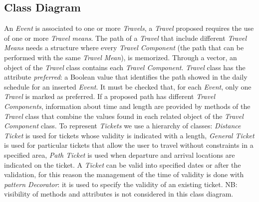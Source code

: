 \subsection{Class Diagram}
\noindent{}
\newline
An \textit{Event} is associated to one or more \textit{Travels}, a \textit{Travel} proposed requires the use of one or more \textit{Travel means}. The path of a \textit{Travel} that include different \textit{Travel Means} needs a structure where every \textit{Travel Component} (the path that can be performed with the same \textit{Travel Mean}), is memorized. Through a vector, an object of the \textit{Travel} class contains each \textit{Travel Component}.
\newline
\newline
\textit{Travel} class has the attribute \textit{preferred}: a Boolean value that identifies the path showed in the daily schedule for an inserted \textit{Event}. It must be checked that, for each \textit{Event}, only one \textit{Travel} is marked as preferred.
\newline
If a proposed path has different \textit{Travel Components}, information about time and length are provided by methods of the \textit{Travel} class that combine the values found in each related object of the \textit{Travel Component} class.
\newline
\newline
To represent \textit{Tickets} we use a hierarchy of classes: \textit{Distance Ticket} is used for tickets whose validity is indicated with a length, \textit{General Ticket} is used for particular tickets that allow the user to travel without constraints in a specified area, \textit{Path Ticket} is used when departure and arrival locations are indicated on the ticket. 
\newline
A \textit{Ticket} can be valid into specified dates or after the validation, for this reason the management of the time of validity is done with \textit{pattern Decorator}: it is used to specify the validity of an existing ticket.
\newline
\newline
NB: visibility of methods and attributes is not considered in this class diagram.
